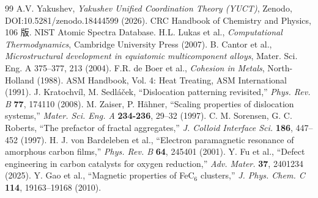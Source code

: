 \documentclass[12pt,a4paper]{article}
\begin{document}
	\begin{thebibliography}{99}
		 A.V. Yakushev, \emph{Yakushev Unified Coordination Theory (YUCT)}, Zenodo, DOI:10.5281/zenodo.18444599 (2026).
		 CRC Handbook of Chemistry and Physics, 106 版.
		 NIST Atomic Spectra Database.
		 H.L. Lukas et al., \emph{Computational Thermodynamics}, Cambridge University Press (2007).
		 B. Cantor et al., \emph{Microstructural development in equiatomic multicomponent alloys}, Mater. Sci. Eng. A 375–377, 213 (2004).
		 F.R. de Boer et al., \emph{Cohesion in Metals}, North-Holland (1988).
		 ASM Handbook, Vol. 4: Heat Treating, ASM International (1991).
		 J. Kratochv\'il, M. Sedl\'a\v{c}ek, ``Dislocation patterning revisited,'' \emph{Phys. Rev. B} \textbf{77}, 174110 (2008).
		 M. Zaiser, P. H\"ahner, ``Scaling properties of dislocation systems,'' \emph{Mater. Sci. Eng. A} \textbf{234-236}, 29–32 (1997).
		 C. M. Sorensen, G. C. Roberts, ``The prefactor of fractal aggregates,'' \emph{J. Colloid Interface Sci.} \textbf{186}, 447–452 (1997).
		 H. J. von Bardeleben et al., ``Electron paramagnetic resonance of amorphous carbon films,'' \emph{Phys. Rev. B} \textbf{64}, 245401 (2001).
		 Y. Fu et al., ``Defect engineering in carbon catalysts for oxygen reduction,'' \emph{Adv. Mater.} \textbf{37}, 2401234 (2025).
		 Y. Gao et al., ``Magnetic properties of FeC$_6$ clusters,'' \emph{J. Phys. Chem. C} \textbf{114}, 19163–19168 (2010).
	\end{thebibliography}
	
	
	
\end{document}
